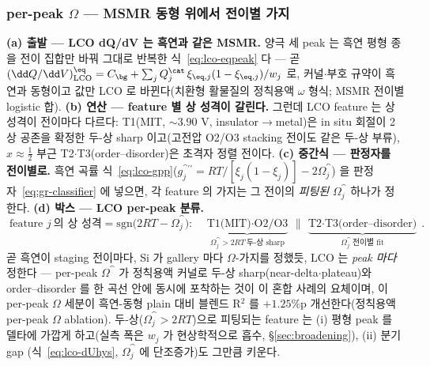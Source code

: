 \subsubsection{per-peak $\Omega$ --- MSMR 동형 위에서 전이별 가지}\label{ssec:lco-omega-perpeak}
\textbf{(a) 출발 --- LCO dQ/dV 는 흑연과 같은 MSMR.} 양극 세 peak 는 흑연 평형 종을 전이 집합만 바꿔 그대로
반복한 식~\eqref{eq:lco-eqpeak} 다 --- 곧 $(\dd Q/\dd V)^\eq_\mathrm{LCO}=C_\bg+\sum_{j}Q_j^\cat\,\xi_{\eq,j}(1-\xi_{\eq,j})/w_j$
로, 커널$\cdot$부호 규약이 흑연과 동형이고 값만 LCO 로 바뀐다(치환형 활물질의 정칙용액 $\omega$ 형식\cite{verbrugge2017};
MSMR 전이별 logistic 합\cite{msmr_origin2017}). \textbf{(b) 연산 --- feature 별 상 성격이 갈린다.} 그런데 LCO
feature 는 상 성격이 전이마다 다르다: T1(MIT, $\sim\!3.90$ V, insulator$\to$metal)은 in situ 회절이 2상 공존을
확정한 두-상 sharp\cite{reimers1992,menetrier1999} 이고(고전압 O2/O3 stacking 전이도 같은 두-상 부류),
$x\!\approx\!\tfrac12$ 부근 T2$\cdot$T3(order--disorder)은 초격자 정렬 전이다\cite{reimers1992,vanderven1998}.
\textbf{(c) 중간식 --- 판정자를 전이별로.} 흑연 곡률 식~\eqref{eq:lco-gpp}($g_j^{\cat\prime\prime}=RT/[\xi_j(1-\xi_j)]-2\Omega_j^\cat$)
을 판정자~\eqref{eq:gr-classifier} 에 넣으면, 각 feature 의 가지는 그 전이의 \emph{피팅된} $\Omega_j^\cat$ 하나가
정한다. \textbf{(d) 박스 --- LCO per-peak 분류.}
\begin{equation}
\boxed{\;
\text{feature }j\ \text{의 상 성격}=\mathrm{sgn}\big(2RT-\Omega_j^\cat\big):\quad
\underbrace{\text{T1(MIT)$\cdot$O2/O3}}_{\Omega_j^\cat>2RT\ \text{두-상 sharp}}
\ \big\|\
\underbrace{\text{T2$\cdot$T3(order--disorder)}}_{\Omega_j^\cat\ \text{전이별 fit}}\;.}
\label{eq:lco-omega-class}
\end{equation}
곧 흑연이 staging 전이마다, Si 가 gallery 마다 $\Omega$-가지를 정했듯, LCO 는 \emph{peak 마다} 정한다 ---
per-peak $\Omega^\cat$ 가 정칙용액 커널로 두-상 sharp(near-delta$\cdot$plateau)와 order--disorder 를 한 곡선 안에
동시에 포착하는 것이 이 혼합 사례의 요체이며, 이 per-peak $\Omega$ 세분이 흑연-동형 plain 대비 블렌드 R$^2$ 를
$+1.25$\%p 개선한다(정칙용액 per-peak $\Omega$ ablation). 두-상($\Omega_j^\cat>2RT$)으로 피팅되는 feature 는
(i) 평형 peak 를 델타에 가깝게 하고(실측 폭은 $w_j$ 가 현상학적으로 흡수, \S\ref{sec:broadening}), (ii) 분기 gap
(식~\eqref{eq:lco-dUhys}, $\Omega_j^\cat$ 에 단조증가)도 그만큼 키운다.

